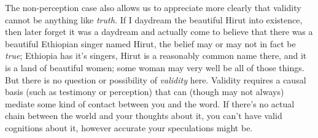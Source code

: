 ﻿\documentclass[11pt]{amsart}
\begin{document}
The non-perception case also allows us to appreciate more clearly that validity cannot be anything like \emph{truth.} If I daydream the beautiful Hirut into existence, then later forget it was a daydream and actually come to believe that there was a beautiful Ethiopian singer named Hirut, the belief may or may not in fact be \emph{true}; Ethiopia has it's singers, Hirut is a reasonably common name there, and it is a land of beautiful women; some woman may very well be all of those things. But there is no question or possibility of \emph{validity} here. Validity requires a causal basis (such as testimony or perception) that can (though may not always) mediate some kind of contact between you and the word. If there's no actual chain between the world and your thoughts about it, you can't have valid cognitions about it, however accurate your speculations might be.%

\
\end{document}
